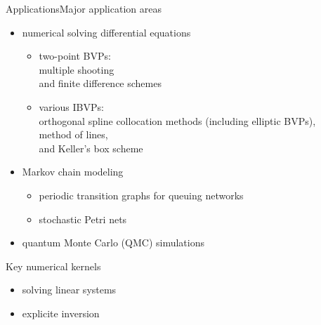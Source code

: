 \documentclass[xcolor=table,final]{beamer} %
\begin{document}
\begin{frame}{Applications}{Major application areas}
  \begin{itemize}
  \item numerical solving differential equations
    \begin{itemize}
    \item two-point BVPs: \\
      {\footnotesize
        multiple shooting \\
        and finite difference schemes
      }
    \item various IBVPs: \\
      {\footnotesize
        orthogonal spline collocation methods (including elliptic BVPs), \\
        method of lines,\\
        and Keller's box scheme
      }
    \end{itemize}
  \item Markov chain modeling
    \begin{itemize}
    \item periodic transition graphs for queuing networks
    \item stochastic Petri nets
    \end{itemize}
  \item quantum Monte Carlo (QMC) simulations 
  \end{itemize}

  \pause
  \begin{exampleblock}{%
      Key numerical kernels}
      \begin{itemize}
      \item solving linear systems
      \item explicite \alert{inversion}
      \end{itemize}
  \end{exampleblock}

\end{frame}
\end{document}
